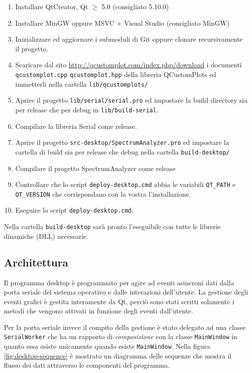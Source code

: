 \begin{enumerate}
\item Installare QtCreator, Qt \(\geq\) 5.0 (consigliato 5.10.0)
\item Installare MinGW oppure MSVC + Visual Studio (consigliato MinGW)
\item Inizializzare ed aggiornare i submoduli di Git oppure clonare
    recursivamente il progetto.
\item Scaricare dal sito \url{http://qcustomplot.com/index.php/download} i
    documenti \texttt{qcustomplot.cpp} \texttt{qcustomplot.hpp} della libreria
    QCustomPlots ed immetterli nella cartella \texttt{lib/qcustomplots/}
\item Aprire il progetto \texttt{lib/serial/serial.pro} ed impostare la
    build directory sia per release che per debug in \texttt{lib/build-serial}.
\item Compilare la libreria Serial come release.
\item Aprire il progetto \texttt{src-desktop/SpectrumAnalyzer.pro} ed
    impostare la cartella di build sia per release che debug nella cartella
        \texttt{build-desktop/}
\item Compilare il progetto SpectrumAnalyzer come release
\item Controllare che lo script \texttt{deploy-desktop.cmd} abbia le variabili
    \texttt{QT\_PATH} e \texttt{QT\_VERSION} che corrispondano con la vostra
    l'installazione.
\item Eseguire lo script \texttt{deploy-desktop.cmd}.
\end{enumerate}
Nella cartella \texttt{build-desktop} sar\`a pronto l'eseguibile con tutte le
librerie dinamiche (DLL) necessarie.

\subsection{Architettura}
Il programma desktop \`e programmato per agire ad eventi asincroni dati dalla
porta seriale del sistema operativo e dalle interazioni dell'utente.
La gestione degli eventi grafici \`e gestita interamente da Qt, perci\`o sono
stati scritti solamente i metodi che vengono attivati in funzione degli eventi
dall'utente.

Per la porta seriale invece il compito della gestione \`e stato delegato ad una
classe \texttt{SerialWorker} che ha un rapporto di \emph{composizione} con la
classe \texttt{MainWindow} in quanto essa esiste unicamente quando esiste
\texttt{MainWindow}. Nella figura \ref{fig:desktop-sequence} \`e mostrato un
diagramma delle sequenze che mostra il flusso dei dati attraverso le
componenti del programma.

